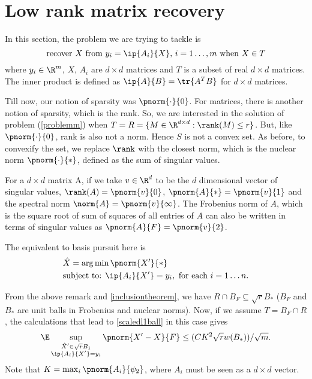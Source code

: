 \section{Low rank matrix recovery}
	In this section, the problem we are trying to tackle is
\begin{equation}\label{problemm}
	\text{recover }X\text{ from }y_i = \ip{A_i}{X},
	\,i=1\ldots, m \text{ when }X \in T
\end{equation}
where $y_i\in\R^m$, $X$, $A_i$ are $d\times d$ matrices
and $T$ is a subset of real $d\times d$ matrices.
The inner product is defined as  $\ip{A}{B}= \tr{A^T B}$
for $d\times d$ matrices.

	Till now, our notion of sparsity was $\pnorm{\cdot}{0}$.
For matrices, there is another notion of sparsity,
which is the rank.
So, we are interested in the solution of problem (\ref{problemm})
when $T = R = \{M\in \R^{d\times d}: \rank(M)\leq r\}$.
But, like $\pnorm{\cdot}{0}$, rank is
also not a norm. Hence $S$ is not a convex set.
As before, to convexify the set, we replace $\rank$ with the
closest norm, which is the nuclear norm $\pnorm{\cdot}{*}$,
defined as the sum of singular values.

\begin{remark}\label{matrixnormsremark}
	For a $d\times d$ matrix A, if we take $v\in\R^d$ to
	be the $d$ dimensional vector of singular values,
	$\rank(A) = \pnorm{v}{0}$, $\pnorm{A}{*} = \pnorm{v}{1}$
	and the spectral norm $\norm{A} = \pnorm{v}{\infty}$.
	The Frobenius norm of $A$, which is the square root of
	sum of squares of all entries of $A$ can also be written
	in terms of singular values as $\pnorm{A}{F} = \pnorm{v}{2}$.
\end{remark}

The equivalent to basis pursuit here is
\begin{equation}\label{mbasispursuit}
	\begin{split}
		&\hat{X} = \arg\min\pnorm{X'}{*}\\
		&\text{subject to: } \ip{A_i}{X'} = y_i,\text{ for each }
		i = 1\ldots n.
	\end{split}
\end{equation}

From the above remark and \eqref{inclusiontheorem},
we have $R\cap B_F \subseteq \sqrt{r}B_*$ ($B_F$ and $B_*$ are
unit balls in Frobenius and nuclear norms).
Now, if we assume $T =  B_F\cap R$, the calculations that
lead to \eqref{scaledl1ball} in this case gives
\begin{equation}\label{errorm}
	\E\sup_{\substack{\hat{X}'\in \sqrt{r}B_1\\ \ip{A_i}{X'} = y_i}}
	\pnorm{X'-X}{F}\leq ({CK^2\sqrt{r} w(B_*)})/{\sqrt{m}}.
\end{equation}
Note that $K = \max_i \pnorm{A_i}{\psi_2}$, where $A_i$
must be seen as a $d\times d$ vector.

